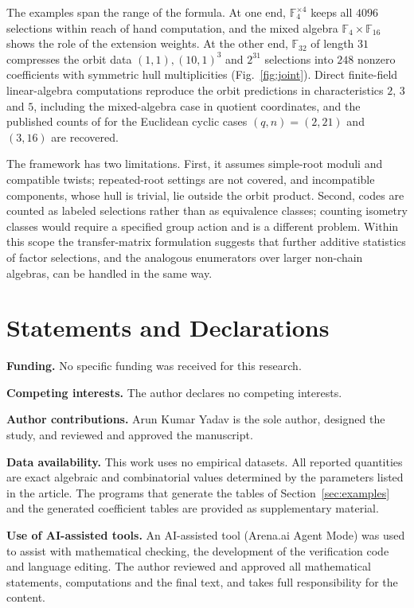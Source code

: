 \documentclass[10pt,a4paper]{article}
\newcommand{\F}{\mathbb F}
\numberwithin{equation}{section}
\theoremstyle{plain}
\theoremstyle{definition}
\theoremstyle{remark}
\begin{document}
The examples span the range of the formula. At one end,
$\F_4^{\times4}$ keeps all $4096$ selections within reach of hand computation,
and the mixed algebra $\F_4\times\F_{16}$ shows the role of the extension
weights. At the other end, $\F_{32}$ of length $31$ compresses the orbit data
$(1,1),(10,1)^3$ and $2^{31}$ selections into $248$ nonzero coefficients with
symmetric hull multiplicities (Fig.~\ref{fig:joint}). Direct finite-field linear-algebra computations reproduce
the orbit predictions in characteristics $2$, $3$ and $5$, including the
mixed-algebra case in quotient coordinates, and the published counts of
\cite{sangwisut2015} for the Euclidean cyclic cases $(q,n)=(2,21)$ and $(3,16)$
are recovered.

The framework has two limitations. First, it assumes simple-root moduli and
compatible twists; repeated-root settings \cite{dinh2010} are not covered, and
incompatible components, whose hull is trivial, lie outside the orbit product.
Second, codes are counted as labeled selections rather than as equivalence
classes; counting isometry classes would require a specified group action
\cite{vanLintWilson2001} and is a different problem. Within this scope the
transfer-matrix formulation suggests that further additive statistics of factor
selections, and the analogous enumerators over larger non-chain algebras, can be
handled in the same way.

\section*{Statements and Declarations}

\noindent\textbf{Funding.} No specific funding was received for this research.

\smallskip
\noindent\textbf{Competing interests.} The author declares no competing
interests.

\smallskip
\noindent\textbf{Author contributions.} Arun Kumar Yadav is the sole author,
designed the study, and reviewed and approved the manuscript.

\smallskip
\noindent\textbf{Data availability.} This work uses no empirical datasets. All
reported quantities are exact algebraic and combinatorial values determined by
the parameters listed in the article. The programs that generate the tables of
Section~\ref{sec:examples} and the generated coefficient tables are provided as
supplementary material.

\smallskip
\noindent\textbf{Use of AI-assisted tools.} An AI-assisted tool (Arena.ai Agent
Mode) was used to assist with mathematical checking, the development of the
verification code and language editing. The author reviewed and approved all
mathematical statements, computations and the final text, and takes full
responsibility for the content.
\end{document}
